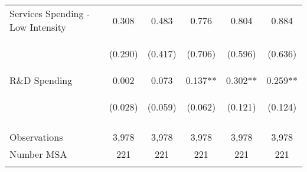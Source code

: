 \begin{tabular}{lccccc}
    Services Spending - Low Intensity & 0.308 & 0.483 & 0.776 & 0.804 & 0.884 \\
    & \begin{footnotesize}(0.290)\end{footnotesize} & \begin{footnotesize}(0.417)\end{footnotesize} & \begin{footnotesize}(0.706)\end{footnotesize} & \begin{footnotesize}(0.596)\end{footnotesize} & \begin{footnotesize}(0.636)\end{footnotesize} \\
    R\&D Spending & 0.002 & 0.073 & 0.137** & 0.302** & 0.259** \\
    & \begin{footnotesize}(0.028)\end{footnotesize} & \begin{footnotesize}(0.059)\end{footnotesize} & \begin{footnotesize}(0.062)\end{footnotesize} & \begin{footnotesize}(0.121)\end{footnotesize} & \begin{footnotesize}(0.124)\end{footnotesize} \\

    & \begin{footnotesize}\end{footnotesize} & \begin{footnotesize}\end{footnotesize} & \begin{footnotesize}\end{footnotesize} & \begin{footnotesize}\end{footnotesize} & \begin{footnotesize}\end{footnotesize} \\
   
   \hline
    Observations & 3,978 & 3,978 & 3,978 & 3,978 & 3,978 \\
    Number MSA & 221 & 221 & 221 & 221 & 221 \\
    \vspace{-2pt} & \vspace{-2pt} & \vspace{-2pt} & \vspace{-2pt} \\
    \hline
    \end{tabular}